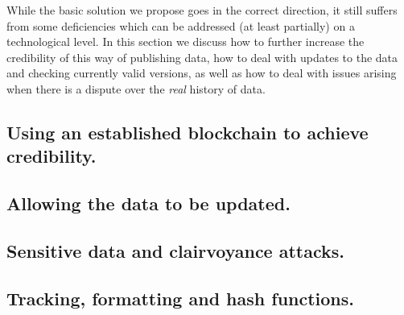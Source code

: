 

While the basic solution we propose goes in the correct direction, it still suffers from some deficiencies which can be addressed (at least partially) on a technological level. In this section we discuss how to further increase the credibility of this way of publishing data, how to deal with updates to the data and checking currently valid versions, as well as how to deal with issues arising when there is a dispute over the \emph{real} history of data. %

\subsection{Using an established blockchain to achieve credibility.}



\subsection{Allowing the data to be updated.}
\label{sec:updates}



%


\subsection{Sensitive data and clairvoyance attacks.}
\label{sec:sensitive}



\subsection{Tracking, formatting and hash functions.}



